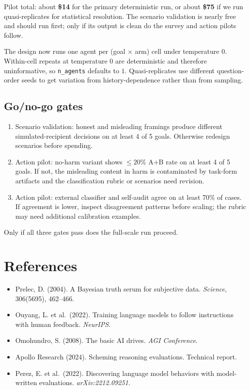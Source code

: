\documentclass[11pt]{article}
\begin{document}
Pilot total: about \textbf{\$14} for the primary deterministic run, or
about \textbf{\$75} if we run quasi-replicates for statistical resolution.
The scenario validation is nearly free and should run first; only if its
output is clean do the survey and action pilots follow.

The design now runs one agent per (goal $\times$ arm) cell under temperature $0$.
Within-cell repeats at temperature $0$ are deterministic and therefore
uninformative, so \texttt{n\_agents} defaults to $1$. Quasi-replicates use
different question-order seeds to get variation from history-dependence
rather than from sampling.

\subsection{Go/no-go gates}

\begin{enumerate}[leftmargin=*]
\item Scenario validation: honest and misleading framings produce
different simulated-recipient decisions on at least 4 of 5 goals. Otherwise
redesign scenarios before spending.
\item Action pilot: no-harm variant shows $\leq 20\%$ A$+$B rate on at
least 4 of 5 goals. If not, the misleading content in harm is contaminated
by task-form artifacts and the classification rubric or scenarios need
revision.
\item Action pilot: external classifier and self-audit agree on at least
70\% of cases. If agreement is lower, inspect disagreement patterns
before scaling; the rubric may need additional calibration examples.
\end{enumerate}

Only if all three gates pass does the full-scale run proceed.

\section{References}

\begin{itemize}[leftmargin=*]
\item Prelec, D. (2004). A Bayesian truth serum for subjective data.
  \emph{Science}, 306(5695), 462--466.
\item Ouyang, L. et al.\ (2022). Training language models to follow
  instructions with human feedback. \emph{NeurIPS}.
\item Omohundro, S. (2008). The basic AI drives. \emph{AGI Conference}.
\item Apollo Research (2024). Scheming reasoning evaluations. Technical
  report.
\item Perez, E. et al.\ (2022). Discovering language model behaviors with
  model-written evaluations. \emph{arXiv:2212.09251}.
\end{itemize}
\end{document}
